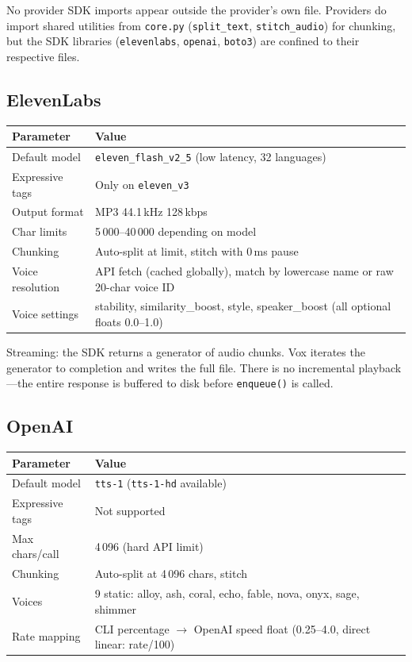 \documentclass[a4paper,10pt]{article}
\begin{document}
No provider SDK imports appear outside the provider's own file.
Providers do import shared utilities from \texttt{core.py}
(\texttt{split\_text}, \texttt{stitch\_audio}) for chunking, but
the SDK libraries (\texttt{elevenlabs}, \texttt{openai},
\texttt{boto3}) are confined to their respective files.

\subsection{ElevenLabs}

\begin{center}
\begin{tabular}{ll}
\toprule
\textbf{Parameter} & \textbf{Value} \\
\midrule
Default model   & \texttt{eleven\_flash\_v2\_5} (low latency, 32 languages) \\
Expressive tags & Only on \texttt{eleven\_v3} \\
Output format   & MP3 44.1\,kHz 128\,kbps \\
Char limits     & 5\,000--40\,000 depending on model \\
Chunking        & Auto-split at limit, stitch with 0\,ms pause \\
Voice resolution & API fetch (cached globally), match by lowercase name
  or raw 20-char voice ID \\
Voice settings  & stability, similarity\_boost, style, speaker\_boost
  (all optional floats 0.0--1.0) \\
\bottomrule
\end{tabular}
\end{center}

Streaming: the SDK returns a generator of audio chunks.  Vox
iterates the generator to completion and writes the full file.
There is no incremental playback---the entire response is
buffered to disk before \texttt{enqueue()} is called.

\subsection{OpenAI}

\begin{center}
\begin{tabular}{ll}
\toprule
\textbf{Parameter} & \textbf{Value} \\
\midrule
Default model   & \texttt{tts-1} (\texttt{tts-1-hd} available) \\
Expressive tags & Not supported \\
Max chars/call  & 4\,096 (hard API limit) \\
Chunking        & Auto-split at 4\,096 chars, stitch \\
Voices          & 9 static: alloy, ash, coral, echo, fable, nova,
  onyx, sage, shimmer \\
Rate mapping    & CLI percentage $\to$ OpenAI speed float
  (0.25--4.0, direct linear: rate/100) \\
\bottomrule
\end{tabular}
\end{center}
\end{document}
